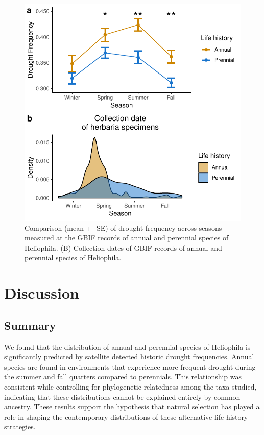 \documentclass[man,floatsintext]{apa6}
\theoremstyle{definition}
\theoremstyle{definition}
\theoremstyle{definition}
\theoremstyle{remark}
\begin{document}
\begin{figure}
\centering
\includegraphics{../figures/line_and_dates.pdf}
\caption{\label{fig:lineplots}Comparison (mean +- SE) of drought frequency across
seasons measured at the GBIF records of annual and perennial species of
Heliophila. (B) Collection dates of GBIF records of annual and perennial
species of Heliophila.}
\end{figure}

\hypertarget{discussion}{%
\section{Discussion}\label{discussion}}

\hypertarget{summary}{%
\subsection{Summary}\label{summary}}

We found that the distribution of annual and perennial species of
Heliophila is significantly predicted by satellite detected historic
drought frequencies. Annual species are found in environments that
experience more frequent drought during the summer and fall quarters
compared to perennials. This relationship was consistent while
controlling for phylogenetic relatedness among the taxa studied,
indicating that these distributions cannot be explained entirely by
common ancestry. These results support the hypothesis that natural
selection has played a role in shaping the contemporary distributions of
these alternative life-history strategies.
\end{document}
